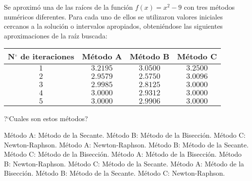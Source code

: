 \begin{pregunta}
\begin{cuerpo}
Se aproxim\'o una de las ra\'ices de la funci\'on $f(x)= x^2-9$ con tres m\'etodos num\'ericos diferentes. Para cada uno de ellos se utilizaron valores iniciales cercanos a la soluci\'on o intervalos apropiados, obteni\'endose las siguientes aproximaciones de la ra\'iz buscada:
\begin{center}
\begin{tabular}{c||c|c|c}
N$^\circ$ de iteraciones & M\'etodo A & M\'etodo B & M\'etodo C  \\
\hline \hline
$1$ & $3.2195$&$3.0500$& $3.2500$  \\
$2$ & $2.9579$&$2.5750$& $3.0096$     \\
$3$ & $2.9985$&$2.8125$& $3.0000$   \\
$4$ & $3.0000$&$2.9312$& $3.0000$ \\   
$5$ & $3.0000$&$2.9906$& $3.0000$ \\ 
\end{tabular}
\end{center}
?`Cuales son estos m\'etodos?
\end{cuerpo}

\begin{alternativas}
{M\'etodo A: M\'etodo de la Secante. M\'etodo B: M\'etodo de la Bisecci\'on. M\'etodo C:  Newton-Raphson.}  %
{M\'etodo A: Newton-Raphson. M\'etodo B: M\'etodo de la Secante. M\'etodo C: M\'etodo de la Bisecci\'on.}
{M\'etodo A: M\'etodo de la Bisecci\'on. M\'etodo B:  Newton-Raphson. M\'etodo C: M\'etodo de la Secante.} 
{M\'etodo A: M\'etodo de la Bisecci\'on. M\'etodo B: M\'etodo de la Secante. M\'etodo C:  Newton-Raphson.}
\end{alternativas}
\justificacion{7cm}
\end{pregunta}